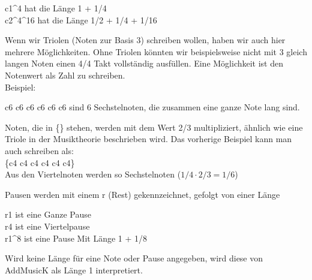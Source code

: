 \bigskip

c1\textasciicircum4 hat die Länge 1 + 1/4 \\
c2\textasciicircum4\textasciicircum16 hat die Länge 1/2 + 1/4 + 1/16

\bigskip

Wenn wir Triolen (Noten zur Basis 3) schreiben wollen, haben wir auch hier mehrere Möglichkeiten.
Ohne Triolen könnten wir beispielsweise nicht mit 3 gleich langen Noten einen 4/4 Takt vollständig ausfüllen.
Eine Möglichkeit ist den Notenwert als Zahl zu schreiben. \\
Beispiel:

\bigskip

c6 c6 c6 c6 c6 c6 sind 6 Sechstelnoten, die zusammen eine ganze Note lang sind.

\bigskip

Noten, die in \{\} stehen, werden mit dem Wert 2/3 multipliziert, ähnlich wie eine Triole in der Musiktheorie beschrieben wird. Das vorherige Beispiel kann man auch schreiben als: \\
\{c4 c4 c4 c4 c4 c4\} \\
Aus den Viertelnoten werden so Sechstelnoten ($1/4 \cdot 2/3 = 1/6$)

\bigskip

Pausen werden mit einem r (Rest) gekennzeichnet, gefolgt von einer Länge

\bigskip

r1 ist eine Ganze Pause \\
r4 ist eine Viertelpause \\
r1\textasciicircum8 ist eine Pause Mit Länge 1 + 1/8 

\bigskip

Wird keine Länge für eine Note oder Pause angegeben, wird diese von AddMusicK als Länge 1 interpretiert.
